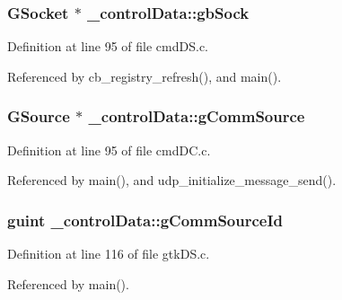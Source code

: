 \subsubsection[{\texorpdfstring{gb\+Sock}{gbSock}}]{\setlength{\rightskip}{0pt plus 5cm}G\+Socket $\ast$ \+\_\+control\+Data\+::gb\+Sock}\hypertarget{struct__control_data_a3023250e01849cb311a7207746a3b64e}{}\label{struct__control_data_a3023250e01849cb311a7207746a3b64e}


Definition at line 95 of file cmd\+D\+S.\+c.



Referenced by cb\+\_\+registry\+\_\+refresh(), and main().

\subsubsection[{\texorpdfstring{g\+Comm\+Source}{gCommSource}}]{\setlength{\rightskip}{0pt plus 5cm}G\+Source $\ast$ \+\_\+control\+Data\+::g\+Comm\+Source}\hypertarget{struct__control_data_abfbd9e642ba240fa5985f63d60886de4}{}\label{struct__control_data_abfbd9e642ba240fa5985f63d60886de4}


Definition at line 95 of file cmd\+D\+C.\+c.



Referenced by main(), and udp\+\_\+initialize\+\_\+message\+\_\+send().

\subsubsection[{\texorpdfstring{g\+Comm\+Source\+Id}{gCommSourceId}}]{\setlength{\rightskip}{0pt plus 5cm}guint \+\_\+control\+Data\+::g\+Comm\+Source\+Id}\hypertarget{struct__control_data_a599cefa2edf28b0cf58f9180a3be0a19}{}\label{struct__control_data_a599cefa2edf28b0cf58f9180a3be0a19}


Definition at line 116 of file gtk\+D\+S.\+c.



Referenced by main().

